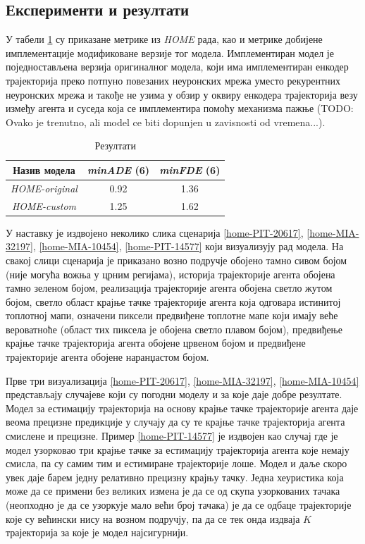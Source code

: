 \documentclass[11pt,oneside]{memoir}
\begin{document}
\subsection{Експерименти и резултати}

У табели \ref{heatmap-results} су приказане метрике из \textit{HOME} \cite{home} рада, као и метрике добијене
имплементације модификоване верзије тог модела. Имплементиран модел је поједностављена верзија оригиналног модела,
који има имплементиран енкодер трајекторија преко потпуно повезаних неуронских мрежа уместо рекурентних неуронских мрежа
и такође не узима у обзир у оквиру енкодера трајекторија везу између агента и суседа која се имплементира помоћу механизма пажње 
(TODO: Ovako je trenutno, ali model ce biti dopunjen u zavisnosti od vremena...).

\begin{table}[H]
  \centering
  \begin{tabular}{c|c|c}
    Назив модела & \textit{minADE} (6) & \textit{minFDE} (6) \\
    \hline
    \textit{HOME-original} & 0.92 & 1.36 \\
    \textit{HOME-custom} & 1.25 & 1.62 \\
  \end{tabular}
  \caption{Резултати}
  \label{heatmap-results}
\end{table}

У наставку је издвојено неколико слика сценарија \ref{home-PIT-20617}, \ref{home-MIA-32197}, \ref{home-MIA-10454}, \ref{home-PIT-14577} 
који визуализују рад модела. На свакој слици сценарија је приказано возно подручје обојено тамно сивом бојом (није могућа вожња
у црним регијама), историја трајекторије агента обојена тамно зеленом бојом, реализација трајекторије агента обојена светло жутом бојом,
светло област крајње тачке трајекторије агента која одговара истинитој топлотној мапи, означени пиксели предвиђене топлотне мапе
који имају веће вероватноће (област тих пиксела је обојена светло плавом бојом), предвиђење крајње тачке трајекторија агента
обојене црвеном бојом и предвиђене трајекторије агента обојене наранџастом бојом.

Прве три визуализација \ref{home-PIT-20617}, \ref{home-MIA-32197}, \ref{home-MIA-10454} представљају случајеве који су погодни моделу
и за које даје добре резултате. Модел за естимацију трајекторија на основу крајње тачке трајекторије агента даје веома прецизне
предикције у случају да су те крајње тачке трајекторија агента смислене и прецизне. Пример \ref{home-PIT-14577} је издвојен као случај
где је модел узорковао три крајње тачке за естимацију трајекторија агента које немају смисла, па су самим тим и естимиране трајекторије лоше.
Модел и даље скоро увек даје барем једну релативно прецизну крајњу тачку. Једна хеуристика која може да се примени без великих измена је да
се од скупа узоркованих тачака (неопходно је да се узоркује мало већи број тачака) је да се одбаце трајекторије које су већински нису на возном
подручју, па да се тек онда издваја $K$ трајекторија за које је модел најсигурнији.
\end{document}
